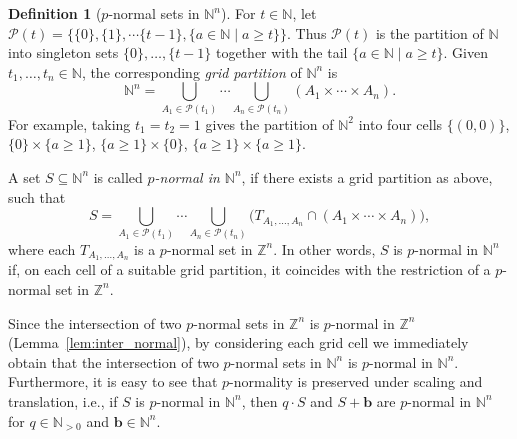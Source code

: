 \documentclass[letterpaper, 11pt, thm-restate]{article}
\numberwithin{equation}{section}
\newcommand{\Z}{\mathbb{Z}}
\newcommand{\N}{\mathbb{N}}
\newcommand{\bb}{\boldsymbol{b}}
\newcommand{\mP}{\mathcal{P}}
\theoremstyle{definition}
\newtheorem{definition}[theorem]{Definition}
\theoremstyle{definition}
\theoremstyle{definition}
\begin{document}
\begin{definition}[$p$-normal sets in $\N^n$]\label{def:pnormal_N}
    For $t \in \N$, let
    $
    \mP(t) = \big\{ \{0\}, \{1\}, \cdots \{t-1\}, \{a \in \N \mid a \geq t\} \big\}.
    $
    Thus $\mP(t)$ is the partition of $\N$ into singleton sets $\{0\}, \ldots, \{t-1\}$ together with the tail $\{a \in \N \mid a \geq t\}$.
    Given $t_1, \ldots, t_n \in \N$, the corresponding \emph{grid partition} of $\N^n$ is
    \[
    \N^n = \bigcup_{A_1 \in \mP(t_1)} \cdots \bigcup_{A_n \in \mP(t_n)} (A_1 \times \cdots \times A_n).
    \]
    For example, taking $t_1 = t_2 = 1$ gives the partition of $\N^2$ into four cells
    $\{(0,0)\}$, $\{0\} \times \{a \geq 1\}$, $\{a \geq 1\} \times \{0\}$, $\{a \geq 1\} \times \{a \geq 1\}$.
    
    A set $S \subseteq \N^n$ is called \emph{$p$-normal in $\N^n$}, if there exists a grid partition as above, such that
    \[
    S = \bigcup_{A_1 \in \mP(t_1)} \cdots \bigcup_{A_n \in \mP(t_n)} \big(T_{A_1, \ldots, A_n} \cap (A_1 \times \cdots \times A_n)\big),
    \]
    where each $T_{A_1, \ldots, A_n}$ is a $p$-normal set in $\Z^n$.
    In other words, $S$ is $p$-normal in $\N^n$ if, on each cell of a suitable grid partition, it coincides with the restriction of a $p$-normal set in $\Z^n$.
\end{definition}

Since the intersection of two $p$-normal sets in $\Z^n$ is $p$-normal in $\Z^n$ (Lemma~\ref{lem:inter_normal}), by considering each grid cell we immediately obtain that the intersection of two $p$-normal sets in $\N^n$ is $p$-normal in $\N^n$.
Furthermore, it is easy to see that $p$-normality is preserved under scaling and translation, i.e., if $S$ is $p$-normal in $\N^n$, then $q \cdot S$ and $S + \bb$ are $p$-normal in $\N^n$ for $q \in \N_{>0}$ and $\bb \in \N^n$.
\end{document}
